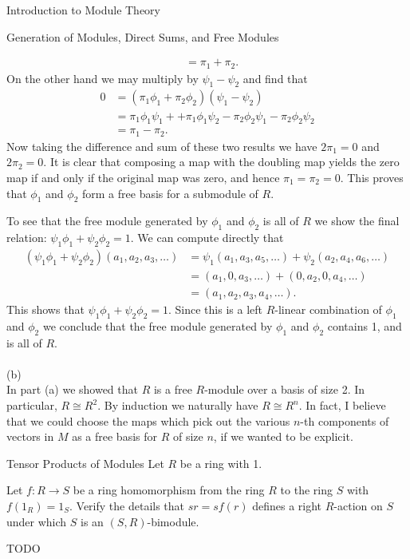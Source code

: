 \begin{chapter}{Introduction to Module Theory}
\begin{section}{Generation of Modules, Direct Sums, and Free Modules}
\begin{solution}
\begin{align*}
& = \pi_1 + \pi_2.
\end{align*}
On the other hand we may multiply by $\psi_1-\psi_2$ and find that \begin{align*}
0 &= (\pi_1\phi_1 + \pi_2\phi_2)(\psi_1-\psi_2)\\
&= \pi_1\phi_1\psi_1 + +\pi_1\phi_1\psi_2 - \pi_2\phi_2\psi_1 - \pi_2\phi_2\psi_2\\
& = \pi_1 - \pi_2.
\end{align*}
Now taking the difference and sum of these two results we have $2\pi_1 = 0$ and $2\pi_2 = 0$. It is clear that composing a map with the doubling map yields the zero map if and only if the original map was zero, and hence $\pi_1 = \pi_2 = 0$. This proves that $\phi_1$ and $\phi_2$ form a free basis for a submodule of $R$. 

To see that the free module generated by $\phi_1$ and $\phi_2$ is all of $R$ we show the final relation: $\psi_1\phi_1+\psi_2\phi_2 = 1$. We can compute directly that \begin{align*}
(\psi_1\phi_1+\psi_2\phi_2)(a_1,a_2,a_3,\ldots) &= \psi_1(a_1,a_3,a_5,\ldots) + \psi_2(a_2,a_4,a_6,\ldots)\\
& = (a_1,0,a_3,\ldots) + (0,a_2,0,a_4,\ldots)\\
& = (a_1,a_2,a_3,a_4,\ldots).
\end{align*}
This shows that $\psi_1\phi_1+\psi_2\phi_2 = 1$. Since this is a left $R$-linear combination of $\phi_1$ and $\phi_2$ we conclude that the free module generated by $\phi_1$ and $\phi_2$ contains 1, and is all of $R$.\\\\
\noindent (b)\\
In part (a) we showed that $R$ is a free $R$-module over a basis of size 2. In particular, $R\cong R^2$. By induction we naturally have $R\cong R^n$. In fact, I believe that we could choose the maps which pick out the various $n$-th components of vectors in $M$ as a free basis for $R$ of size $n$, if we wanted to be explicit. 
\end{solution}\oneperpage



\end{section}









\begin{section}{Tensor Products of Modules}
Let $R$ be a ring with 1. 
\begin{problem}\label{ex:10.4.1}
Let $f:R\to S$ be a ring homomorphism from the ring $R$ to the ring $S$ with $f(1_R) = 1_S$. Verify the details that $sr = sf(r)$ defines a right $R$-action on $S$ under which $S$ is an $(S,R)$-bimodule. 
\end{problem}
\begin{solution}TODO


\end{solution}
\end{section}
\end{chapter}
